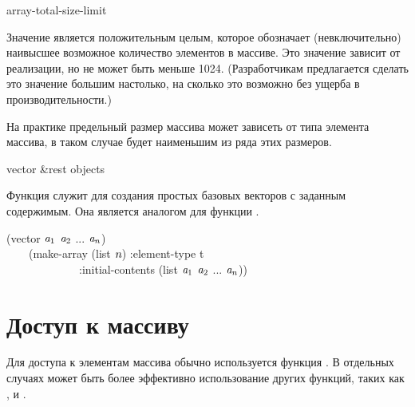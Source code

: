 \begin{defun}[Константа]
array-total-size-limit

Значение  является положительным целым, которое
обозначает (невключительно) наивысшее возможное количество элементов в массиве.
Это значение зависит от реализации, но не может быть меньше 1024.
(Разработчикам предлагается сделать это значение большим настолько, на сколько
это возможно без ущерба в производительности.)

На практике предельный размер массива может зависеть от типа элемента массива, в
таком случае  будет наименьшим из ряда этих размеров.
\end{defun}

\begin{defun}[Функция]
vector &rest objects

Функция  служит для создания простых базовых векторов с заданным
содержимым.
Она является аналогом для функции .
\begin{lisp}
(vector $\emph{a}_1$ $\emph{a}_2$ ... $\emph{a}_{n}$) \\
~~~\EQ\ (make-array (list $\emph{n}$) :element-type t \\
~~~~~~~~~~~~~:initial-contents (list $\emph{a}_1$ $\emph{a}_2$ ... $\emph{a}_{n}$))
\end{lisp}
\end{defun}

\section{Доступ к массиву}

Для доступа к элементам массива обычно используется функция .
В отдельных случаях может быть более эффективно использование
других функций, таких как ,  и .

